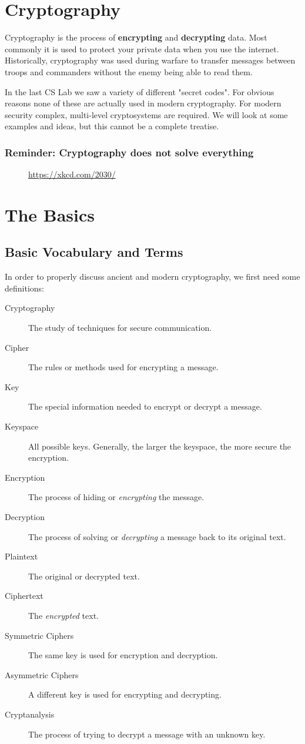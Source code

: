 \documentclass[11pt,a4paper]{report}
\begin{document}
\section{Cryptography}
Cryptography is the process of {\bf encrypting} and {\bf decrypting} data. Most commonly it is used to protect your private data when you use the internet. Historically, cryptography was used during warfare to transfer messages between troops and commanders without the enemy being able to read them.

In the last CS Lab we saw a variety of different "secret codes". For obvious reasons none of these are actually used in modern cryptography. For modern security complex, multi-level cryptosystems are required. We will look at some examples and ideas, but this cannot be a complete treatise.

\subsubsection{Reminder: Cryptography does not solve everything}

\begin{figure}[h]
\caption{\url{https://xkcd.com/2030/}}
\end{figure}


\newpage
\section{The Basics}
\subsection{Basic Vocabulary and Terms}
In order to properly discuss ancient and modern cryptography, we first need some definitions: 
\begin{description}
\item[Cryptography] The study of techniques for secure communication.
\item[Cipher] The rules or methods used for encrypting a message.
\item[Key] The special information needed to encrypt or decrypt a message.
\item[Keyspace] All possible keys. Generally, the larger the keyspace, the more secure the encryption.
\item[Encryption] The process of hiding or \emph{encrypting} the message.
\item[Decryption] The process of solving or \emph{decrypting} a message back to its original text.
\item[Plaintext] The original or decrypted text.
\item[Ciphertext] The \emph{encrypted} text.
\item[Symmetric Ciphers] The same key is used for encryption and decryption.
\item[Asymmetric Ciphers] A different key is used for encrypting and decrypting.
\item[Cryptanalysis] The process of trying to decrypt a message with an unknown key.
\end{description}
\end{document}
